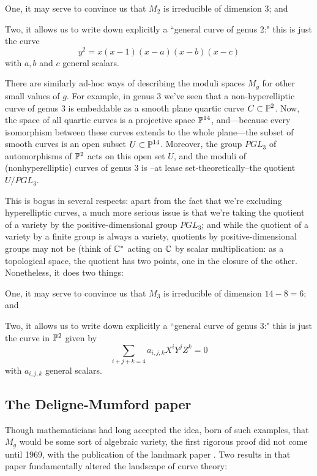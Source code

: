 One, it may serve to convince us that $M_2$ is irreducible of dimension 3; and

Two, it allows us to write down explicitly a ``general curve of genus 2:" this is just the curve
$$
y^2 = x(x-1)(x-a)(x-b)(x-c)
$$
with $a, b$ and $c$ general scalars.

There are similarly ad-hoc ways of describing the moduli spaces $M_g$ for other small values of $g$. For example, in genus 3 we've seen that a non-hyperelliptic curve of genus 3 is embeddable as a smooth plane quartic curve $C \subset \PP^2$. Now, the space of all quartic curves is a projective space $\PP^{14}$, and---because every isomorphism between these curves extends to the whole plane---the subset of smooth curves is an open subset $U \subset \PP^{14}$. Moreover, the group $PGL_3$ of automorphisms of $\PP^2$ acts on this open set $U$, and  the moduli of (nonhyperelliptic) curves of genus 3 is --at lease set-theoretically--the quotient $U/PGL_3$.

This is bogus in several respects: apart from the fact that we're excluding hyperelliptic curves, a much more serious issue is that we're taking the quotient of a variety by the positive-dimensional group $PGL_3$; and while the quotient of a variety by a finite group is always a variety, quotients by positive-dimensional groups may not be (think of $\CC^*$ acting on $\CC$ by scalar multiplication: as a topological space, the quotient has two points, one in the closure of the other.  Nonetheless, it does two things:

One, it may serve to convince us that $M_3$ is irreducible of dimension $14-8 = 6$; and

Two, it allows us to write down explicitly a ``general curve of genus 3:" this is just the curve in $\PP^2$ given by
$$
\sum_{i+j+k = 4} a_{i,j,k} X^iY^jZ^k = 0
$$
with $a_{i,j,k}$ general scalars.

\subsection{The Deligne-Mumford paper}

Though mathematicians had long accepted the idea, born of such examples, that $M_g$ would be some sort of algebraic variety, the first rigorous proof did not come until 1969, with the publication of the landmark paper \cite{Deligne-Mumford}. Two results in that paper fundamentally altered the landscape of curve theory:

